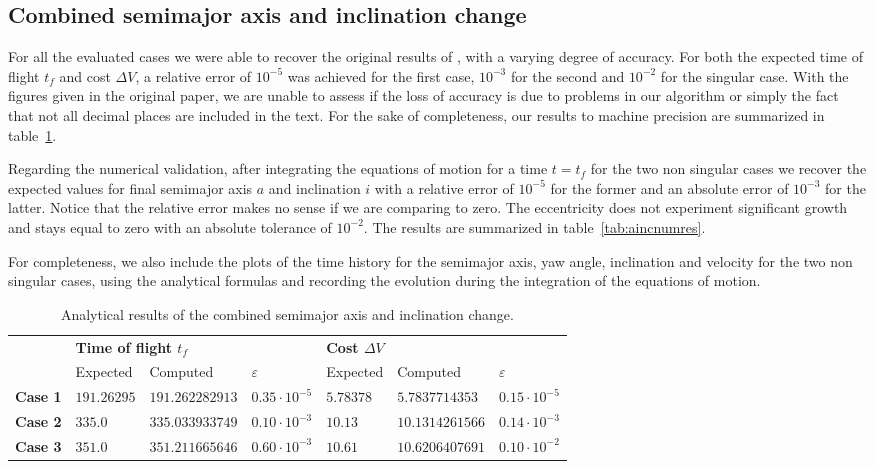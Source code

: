 \subsection{Combined semimajor axis and inclination change} \label{sec:resedelbaum}

For all the evaluated cases we were able to recover the original results of \cite{kechichian1997reformulation}, with a varying degree of accuracy. For both the expected time of flight $t_f$ and cost $\Delta V$, a relative error of $10^{-5}$ was achieved for the first case, $10^{-3}$ for the second and $10^{-2}$ for the singular case. With the figures given in the original paper, we are unable to assess if the loss of accuracy is due to problems in our algorithm or simply the fact that not all decimal places are included in the text. For the sake of completeness, our results to machine precision are summarized in table~\ref{tab:aincanares}.

Regarding the numerical validation, after integrating the equations of motion for a time $t = t_f$ for the two non singular cases we recover the expected values for final semimajor axis $a$ and inclination $i$ with a relative error of $10^{-5}$ for the former and an absolute error of $10^{-3}$ for the latter. Notice that the relative error makes no sense if we are comparing to zero. The eccentricity does not experiment significant growth and stays equal to zero with an absolute tolerance of $10^{-2}$. The results are summarized in table~\ref{tab:aincnumres}.

For completeness, we also include the plots of the time history for the semimajor axis, yaw angle, inclination and velocity for the two non singular cases, using the analytical formulas and recording the evolution during the integration of the equations of motion.

\begin{table}[b]
\centering
\begin{tabular}{|l|l|l|l|l|l|l|}
\hline
\multirow{2}{*}{} & \multicolumn{3}{l|}{\textbf{Time of flight $t_f$}}   & \multicolumn{3}{l|}{\textbf{Cost $\Delta V$}}      \\ \cline{2-7} 
                  & Expected    & Computed        & $\varepsilon$       & Expected  & Computed        & $\varepsilon$       \\ \hline
\textbf{Case 1}   & $191.26295$ & $191.262282913$ & $0.35 \cdot 10^{-5}$ & $5.78378$ & $5.7837714353$  & $0.15 \cdot 10^{-5}$ \\ \hline
\textbf{Case 2}   & $335.0$     & $335.033933749$ & $0.10 \cdot 10^{-3}$ & $10.13$   & $10.1314261566$ & $0.14 \cdot 10^{-3}$ \\ \hline
\textbf{Case 3}   & $351.0$     & $351.211665646$ & $0.60 \cdot 10^{-3}$ & $10.61$   & $10.6206407691$ & $0.10 \cdot 10^{-2}$ \\ \hline
\end{tabular}
\caption{Analytical results of the combined semimajor axis and inclination change.}
\label{tab:aincanares}
\end{table}

